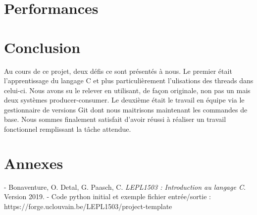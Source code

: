 \documentclass{article}
\begin{document}
\section{Performances}
\section{Conclusion}
Au cours de ce projet, deux défis ce sont présentés à nous. Le premier était l'apprentissage du langage C et plus particulièrement l'ulisations des threads dans celui-ci. Nous avons su le relever en utilisant, de façon originale, non pas un mais deux systèmes producer-consumer. Le deuxième était le travail en équipe via le gestionnaire de versions Git dont nous maitrisons maintenant les commandes de base. Nous sommes finalement satisfait d'avoir réussi à réaliser un travail fonctionnel remplissant la tâche attendue.
\section{Annexes}


- Bonaventure, O. Detal, G. Paasch, C. \textit{LEPL1503 : Introduction au langage C}. Version 2019.
- Code python initial et exemple fichier entrée/sortie :  https://forge.uclouvain.be/LEPL1503/project-template
\end{document}
